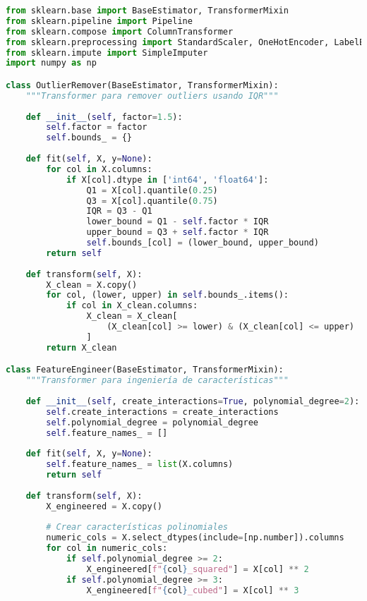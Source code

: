 \begin{lstlisting}[language=Python, caption=Pipeline de preprocesamiento modular]
from sklearn.base import BaseEstimator, TransformerMixin
from sklearn.pipeline import Pipeline
from sklearn.compose import ColumnTransformer
from sklearn.preprocessing import StandardScaler, OneHotEncoder, LabelEncoder
from sklearn.impute import SimpleImputer
import numpy as np

class OutlierRemover(BaseEstimator, TransformerMixin):
    """Transformer para remover outliers usando IQR"""
    
    def __init__(self, factor=1.5):
        self.factor = factor
        self.bounds_ = {}
    
    def fit(self, X, y=None):
        for col in X.columns:
            if X[col].dtype in ['int64', 'float64']:
                Q1 = X[col].quantile(0.25)
                Q3 = X[col].quantile(0.75)
                IQR = Q3 - Q1
                lower_bound = Q1 - self.factor * IQR
                upper_bound = Q3 + self.factor * IQR
                self.bounds_[col] = (lower_bound, upper_bound)
        return self
    
    def transform(self, X):
        X_clean = X.copy()
        for col, (lower, upper) in self.bounds_.items():
            if col in X_clean.columns:
                X_clean = X_clean[
                    (X_clean[col] >= lower) & (X_clean[col] <= upper)
                ]
        return X_clean

class FeatureEngineer(BaseEstimator, TransformerMixin):
    """Transformer para ingeniería de características"""
    
    def __init__(self, create_interactions=True, polynomial_degree=2):
        self.create_interactions = create_interactions
        self.polynomial_degree = polynomial_degree
        self.feature_names_ = []
    
    def fit(self, X, y=None):
        self.feature_names_ = list(X.columns)
        return self
    
    def transform(self, X):
        X_engineered = X.copy()
        
        # Crear características polinomiales
        numeric_cols = X.select_dtypes(include=[np.number]).columns
        for col in numeric_cols:
            if self.polynomial_degree >= 2:
                X_engineered[f"{col}_squared"] = X[col] ** 2
            if self.polynomial_degree >= 3:
                X_engineered[f"{col}_cubed"] = X[col] ** 3
        

\end{lstlisting}
